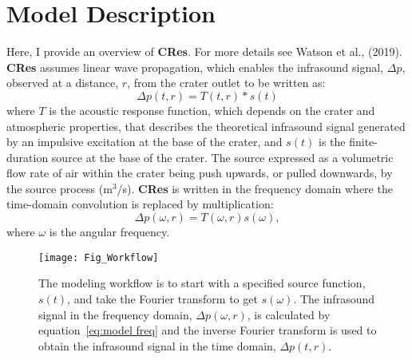\documentclass[10pt]{article}
\begin{document}
\section{Model Description}
Here, I provide an overview of {\bf CRes}. For more details see Watson et al., (2019). {\bf CRes} assumes linear wave propagation, which enables the infrasound signal, $\Delta p$, observed at a distance, $r$, from the crater outlet to be written as:
\begin{equation}
\Delta p(t,r) = T(t,r) \ast s(t)
\label{eq:model time}
\end{equation}
where $T$ is the acoustic response function, which depends on the crater and atmospheric properties, that describes the theoretical infrasound signal generated by an impulsive excitation at the base of the crater, and $s(t)$ is the finite-duration source at the base of the crater. The source expressed as a volumetric flow rate of air within the crater being push upwards, or pulled downwards, by the source process (m$^3$/s). {\bf CRes} is written in the frequency domain where the time-domain convolution is replaced by multiplication:
\begin{equation}
\Delta p(\omega,r) = T(\omega,r) s(\omega),
\label{eq:model freq}
\end{equation}
where $\omega$ is the angular frequency.

\begin{figure}[h!]
\centering
\texttt{[image: Fig\_Workflow]}
\caption{The modeling workflow is to start with a specified source function, $s(t)$, and take the Fourier transform to get $s(\omega)$. The infrasound signal in the frequency domain, $\Delta p(\omega,r)$, is calculated by equation~\ref{eq:model freq} and the inverse Fourier transform is used to obtain the infrasound signal in the time domain, $\Delta p(t,r)$. }
\end{figure}
\end{document}
